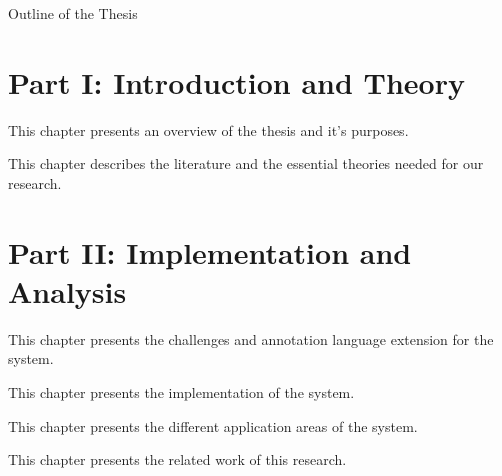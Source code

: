 \clearemptydoublepage

{}

\begin{center}
	\huge{Outline of the Thesis}
\end{center}


\section*{Part I: Introduction and Theory}

  \vspace{1mm}

\noindent  This chapter presents an overview of the thesis and it's purposes. 

  \vspace{1mm}

\noindent  This chapter describes the literature and the essential theories needed for our research.

\section*{Part II: Implementation and Analysis}

  \vspace{1mm}

\noindent  This chapter presents the challenges and annotation language extension for the system.

  \vspace{1mm}

\noindent  This chapter presents the implementation of the system.

  \vspace{1mm}

\noindent  This chapter presents the different application areas of the system.

  \vspace{1mm}

\noindent  This chapter presents the related work of this research.

